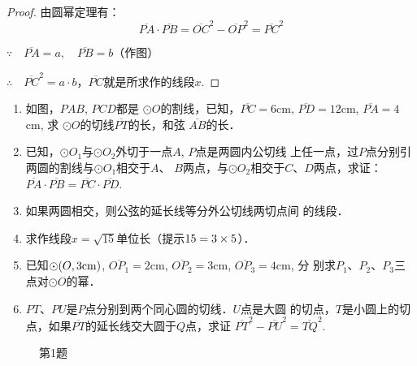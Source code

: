 \begin{proof}
    由圆幂定理有：
\[    \overline{PA}\cdot \overline{PB}=\overline{OC}^2-\overline{OP}^2=\overline{PC}^2\]

$\because\quad \overline{PA}=a,\quad \overline{PB}=b$（作图）

$\therefore\quad \overline{PC}^2=a\cdot b$，$\overline{PC}$就是所求作的线段$x$.
\end{proof}

\begin{ex}
\begin{enumerate}
  \item 如图，$PAB$, $PCD$都是
$\odot O$的割线，已知，$\overline{PC}=6$cm, 
  $\overline{PD}=12$cm, $\overline{PA}=4$cm, 求
  $\odot O$的切线$\overline{PT}$的长，和弦
  $\overline{AB}$的长．
  \item 已知，$\odot O_1$与$\odot O_2$外切于一点$A$, $P$点是两圆内公切线
  上任一点，过$P$点分别引两圆的割线与$\odot O_1$相交于$A$、
  $B$两点，与$\odot O_2$相交于$C$、$D$两点，求证：$\overline{PA}\cdot \overline{PB}=
  \overline{PC}\cdot\overline{PD}$.
  \item 如果两圆相交，则公弦的延长线等分外公切线两切点间
  的线段．
  \item 求作线段$x=\sqrt{15}$单位长（提示$15=3\times5$）．
  \item 已知$\odot (O,3{\rm cm})$, $\overline{OP_1}=2$cm, $\overline{OP_2}=3$cm, $\overline{OP_3}=4$cm, 分
  别求$P_1$、$P_2$、$P_3$三点对$\odot O$的幂．
  \item $PT$、$PU$是$P$点分别到两个同心圆的切线．$U$点是大圆
  的切点，$T$是小圆上的切点，如果$\overline{PT}$的延长线交大圆于$Q$点，求证
  $\overline{PT}^2-\overline{PU}^2=\overline{TQ}^2$.
\end{enumerate}
\end{ex}

\begin{figure}[htp]
  \centering
  \caption*{第1题}
\end{figure}
    
